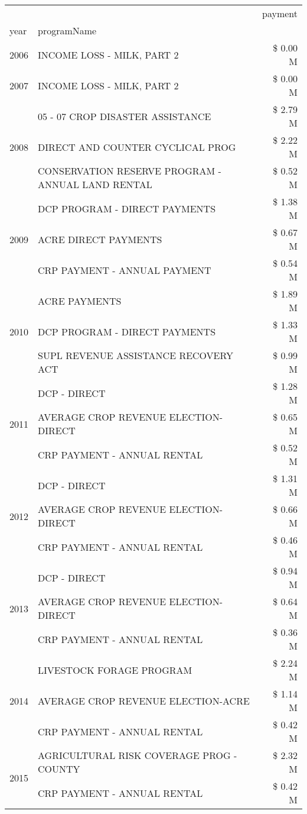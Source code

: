 \begin{tabular}{llr}
\toprule
 &  & payment \\
year & programName &  \\
\midrule
2006 & INCOME LOSS - MILK, PART 2 & \$ 0.00 M \\
\cline{1-3}
2007 & INCOME LOSS - MILK, PART 2 & \$ 0.00 M \\
\cline{1-3}
\multirow[t]{3}{*}{2008} & 05 - 07 CROP DISASTER ASSISTANCE & \$ 2.79 M \\
 & DIRECT AND COUNTER CYCLICAL PROG & \$ 2.22 M \\
 & CONSERVATION RESERVE PROGRAM - ANNUAL LAND RENTAL & \$ 0.52 M \\
\cline{1-3}
\multirow[t]{3}{*}{2009} & DCP PROGRAM - DIRECT PAYMENTS & \$ 1.38 M \\
 & ACRE DIRECT PAYMENTS & \$ 0.67 M \\
 & CRP PAYMENT - ANNUAL PAYMENT & \$ 0.54 M \\
\cline{1-3}
\multirow[t]{3}{*}{2010} & ACRE PAYMENTS & \$ 1.89 M \\
 & DCP PROGRAM - DIRECT PAYMENTS & \$ 1.33 M \\
 & SUPL REVENUE ASSISTANCE RECOVERY ACT & \$ 0.99 M \\
\cline{1-3}
\multirow[t]{3}{*}{2011} & DCP - DIRECT & \$ 1.28 M \\
 & AVERAGE CROP REVENUE ELECTION-DIRECT & \$ 0.65 M \\
 & CRP PAYMENT - ANNUAL RENTAL & \$ 0.52 M \\
\cline{1-3}
\multirow[t]{3}{*}{2012} & DCP - DIRECT & \$ 1.31 M \\
 & AVERAGE CROP REVENUE ELECTION-DIRECT & \$ 0.66 M \\
 & CRP PAYMENT - ANNUAL RENTAL & \$ 0.46 M \\
\cline{1-3}
\multirow[t]{3}{*}{2013} & DCP - DIRECT & \$ 0.94 M \\
 & AVERAGE CROP REVENUE ELECTION-DIRECT & \$ 0.64 M \\
 & CRP PAYMENT - ANNUAL RENTAL & \$ 0.36 M \\
\cline{1-3}
\multirow[t]{3}{*}{2014} & LIVESTOCK FORAGE PROGRAM & \$ 2.24 M \\
 & AVERAGE CROP REVENUE ELECTION-ACRE & \$ 1.14 M \\
 & CRP PAYMENT - ANNUAL RENTAL & \$ 0.42 M \\
\cline{1-3}
\multirow[t]{3}{*}{2015} & AGRICULTURAL RISK COVERAGE PROG - COUNTY & \$ 2.32 M \\
 & CRP PAYMENT - ANNUAL RENTAL & \$ 0.42 M \\

\end{tabular}
